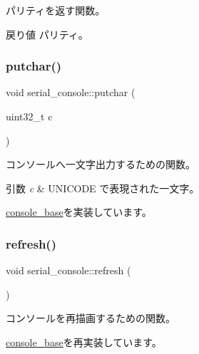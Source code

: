 パリティを返す関数。 \begin{DoxyReturn}{戻り値}
パリティ。 
\end{DoxyReturn}
\hypertarget{classserial__console_aa75329918015828987a4327d183e82fc}{}\label{classserial__console_aa75329918015828987a4327d183e82fc} 
\subsubsection{\texorpdfstring{putchar()}{putchar()}}
{\footnotesize\ttfamily void serial\+\_\+console\+::putchar (\begin{DoxyParamCaption}\item[{uint32\+\_\+t}]{c }\end{DoxyParamCaption})\hspace{0.3cm}{\ttfamily [virtual]}}

コンソールへ一文字出力するための関数。 
\begin{DoxyParams}{引数}
{\em c} & U\+N\+I\+C\+O\+DE で表現された一文字。 \\
\hline
\end{DoxyParams}


\hyperlink{classconsole__base_a584c38d4ca34363f399895e30133b814}{console\+\_\+base}を実装しています。

\hypertarget{classserial__console_ab652d9c5c8122739dfa377625f457333}{}\label{classserial__console_ab652d9c5c8122739dfa377625f457333} 
\subsubsection{\texorpdfstring{refresh()}{refresh()}}
{\footnotesize\ttfamily void serial\+\_\+console\+::refresh (\begin{DoxyParamCaption}{ }\end{DoxyParamCaption})\hspace{0.3cm}{\ttfamily [virtual]}}

コンソールを再描画するための関数。 

\hyperlink{classconsole__base_abd597aeba24dbc8552479b58db052980}{console\+\_\+base}を再実装しています。

\hypertarget{classserial__console_a86f0ff28692c55debc2f39d3175fc52e}{}\label{classserial__console_a86f0ff28692c55debc2f39d3175fc52e} 
